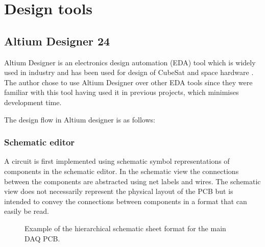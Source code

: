 \documentclass[a4paper,11pt]{article}
\begin{document}



\section{Design tools}

\subsection{Altium Designer 24}

Altium Designer is an electronics design automation (EDA) tool which is widely used in industry and has been used for design of CubeSat and space hardware \cite{10061409}. %
The author chose to use Altium Designer over other EDA tools since they were familiar with this tool having used it in previous projects, which minimises development time.

The design flow in Altium designer is as follows:
\subsubsection{Schematic editor}
A circuit is first implemented using schematic symbol representations of components in the schematic editor. In the schematic view the connections between the components are abstracted using net labels and wires. The schematic view does not necessarily represent the physical layout of the PCB but is intended to convey the connections between components in a format that can easily be read.



\begin{figure}[H]
  \centering
  
  \caption{Example of the hierarchical schematic sheet format for the main DAQ PCB.}
  \label{fig:altium-schematic-hierarchical}
\end{figure}
\end{document}
